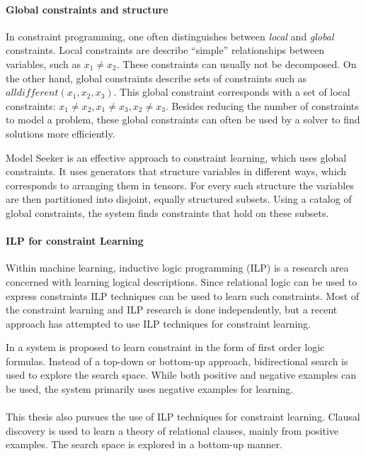 \paragraph{Global constraints and structure}
In constraint programming, one often distinguishes between \textit{local} and \textit{global} constraints.
Local constraints are describe ``simple'' relationships between variables, such as $x_1 \neq x_2$.
These constraints can usually not be decomposed.
On the other hand, global constraints describe sets of constraints such as $\mathit{alldifferent}(x_1, x_2, x_3)$.
This global constraint corresponds with a set of local constraints: $x_1 \neq x_2, x_1 \neq x_3, x_2 \neq x_3$.
Besides reducing the number of constraints to model a problem, these global constraints can often be used by a solver to find solutions more efficiently.

Model Seeker \cite{Beldiceanu:ModelSeeker} is an effective approach to constraint learning, which uses global constraints.
It uses generators that structure variables in different ways, which corresponds to arranging them in tensors.
For every such structure the variables are then partitioned into disjoint, equally structured subsets.
Using a catalog of global constraints, the system finds constraints that hold on these subsets.

\paragraph{ILP for constraint Learning}
Within machine learning, inductive logic programming (ILP) is a research area concerned with learning logical descriptions.
Since relational logic can be used to express constraints ILP techniques can be used to learn such constraints.
Most of the constraint learning and ILP research is done independently, but a recent approach has attempted to use ILP techniques for constraint learning.

In \cite{Lallouet:LearningCP} a system is proposed to learn constraint in the form of first order logic formulas.
Instead of a top-down or bottom-up approach, bidirectional search is used to explore the search space.
While both positive and negative examples can be used, the system primarily uses negative examples for learning.
\\\\
This thesis also pursues the use of ILP techniques for constraint learning.
Clausal discovery is used to learn a theory of relational clauses, mainly from positive examples.
The search space is explored in a bottom-up manner.

